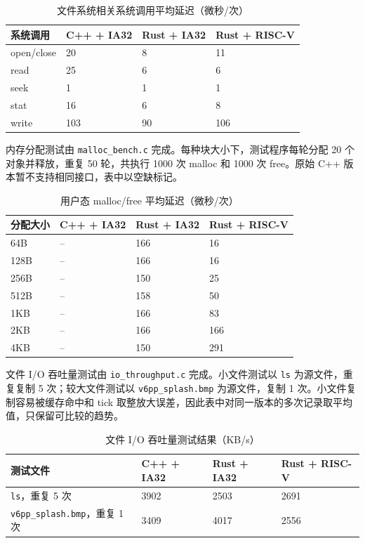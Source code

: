 \begin{table}[H]
  \centering
  \caption{文件系统相关系统调用平均延迟（微秒/次）}\label{tab:syscall-bench}
  \begin{tabular}{p{}p{}p{}p{}}
    \toprule
    \textbf{系统调用} & \textbf{C++ + IA32} & \textbf{Rust + IA32} & \textbf{Rust + RISC-V} \\
    \midrule
    open/close & 20 & 8 & 11 \\
    read       & 25 & 6 & 6 \\
    seek       & 1  & 1 & 1 \\
    stat       & 16 & 6 & 8 \\
    write      & 103 & 90 & 106 \\
    \bottomrule
  \end{tabular}
\end{table}

内存分配测试由 \texttt{malloc\_bench.c} 完成。每种块大小下，测试程序每轮分配 20 个对象并释放，重复 50 轮，共执行 1000 次 malloc 和 1000 次 free。原始 C++ 版本暂不支持相同接口，表中以空缺标记。

\begin{table}[H]
  \centering
  \caption{用户态 malloc/free 平均延迟（微秒/次）}\label{tab:malloc-bench}
  \begin{tabular}{p{}p{}p{}p{}}
    \toprule
    \textbf{分配大小} & \textbf{C++ + IA32} & \textbf{Rust + IA32} & \textbf{Rust + RISC-V} \\
    \midrule
    64B   & -- & 166 & 16 \\
    128B  & -- & 166 & 16 \\
    256B  & -- & 150 & 25 \\
    512B  & -- & 158 & 50 \\
    1KB   & -- & 166 & 83 \\
    2KB   & -- & 166 & 166 \\
    4KB   & -- & 150 & 291 \\
    \bottomrule
  \end{tabular}
\end{table}

文件 I/O 吞吐量测试由 \texttt{io\_throughput.c} 完成。小文件测试以 \texttt{ls} 为源文件，重复复制 5 次；较大文件测试以 \texttt{v6pp\_splash.bmp} 为源文件，复制 1 次。小文件复制容易被缓存命中和 tick 取整放大误差，因此表中对同一版本的多次记录取平均值，只保留可比较的趋势。

\begin{table}[H]
  \centering
  \caption{文件 I/O 吞吐量测试结果（KB/s）}\label{tab:io-bench}
  \begin{tabular}{p{}p{}p{}p{}}
    \toprule
    \textbf{测试文件} & \textbf{C++ + IA32} & \textbf{Rust + IA32} & \textbf{Rust + RISC-V} \\
    \midrule
    \texttt{ls}，重复 5 次 & 3902 & 2503 & 2691 \\
    \texttt{v6pp\_splash.bmp}，重复 1 次 & 3409 & 4017 & 2556 \\
    \bottomrule
  \end{tabular}
\end{table}

